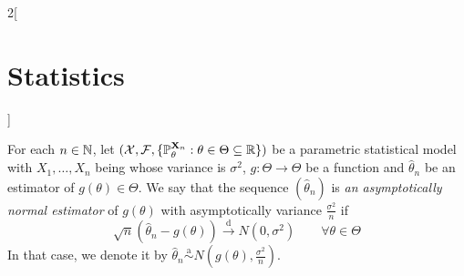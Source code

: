 \documentclass[../../../main.tex]{subfiles}
\begin{document}
\begin{multicols}{2}[\section{Statistics}]
\begin{definition}
  \end{definition}
  \begin{definition}
    For each $n\in\mathbb{N}$, let $(\mathcal{X},\mathcal{F},\{\mathbb{P}_{\theta}^{\boldsymbol{\mathrm{X}}_n}:\theta\in\Theta\subseteq \mathbb{R}\})$ be a parametric statistical model with $X_1,\ldots,X_n$ being \iid whose variance is $\sigma^2$, $g:\Theta\rightarrow\Theta$ be a function and ${{\hat\theta}}_n$ be an estimator of $g(\theta)\in\Theta$. We say that the sequence $({\hat\theta}_n)$ is \emph{an asymptotically normal estimator} of $g(\theta)$ with asymptotically variance $\frac{\sigma^2}{n}$ if $$\sqrt{n}({\hat\theta}_n-g(\theta))\overset{\text{d}}{\longrightarrow}N(0,\sigma^2)\qquad\forall \theta\in\Theta$$
    In that case, we denote it by ${\hat\theta}_n\overset{\text{a}}{\sim}N\left(g(\theta),\frac{\sigma^2}{n}\right)$.
  \end{definition}

\end{multicols}
\end{document}
